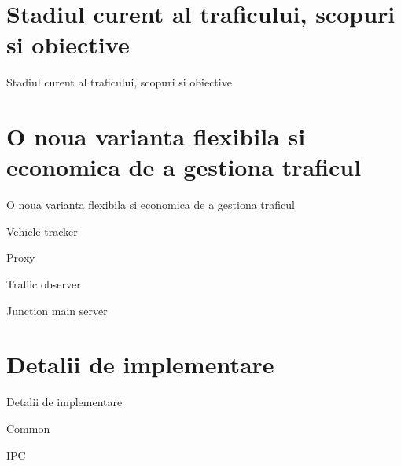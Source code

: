 \documentclass{beamer}
\begin{document}
\section{Stadiul curent al traficului, scopuri si obiective}
    \begin{frame}{Stadiul curent al traficului, scopuri si obiective}

    \end{frame}

\section{O noua varianta flexibila si economica de a gestiona traficul}
    \begin{frame}{O noua varianta flexibila si economica de a gestiona traficul}
    
    \end{frame}

    \begin{frame}{Vehicle tracker}
    
    \end{frame}

    \begin{frame}{Proxy}
    
    \end{frame}

    \begin{frame}{Traffic observer}
    
    \end{frame}

    \begin{frame}{Junction main server}
    
    \end{frame}

\section{Detalii de implementare}
    \begin{frame}{Detalii de implementare}

    \end{frame}

    \begin{frame}{Common}
        
    \end{frame}

    \begin{frame}{IPC}
        
    \end{frame}
\end{document}
